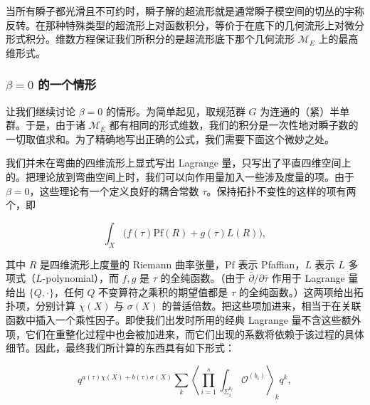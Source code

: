 
当所有瞬子都光滑且不可约时，瞬子解的超流形就是通常瞬子模空间的切丛的宇称反转。在那种特殊类型的超流形上对函数积分，等价于在底下的几何流形上对微分形式积分。维数方程保证我们所积分的是超流形底下那个几何流形 $\mathcal M_E$ 上的最高维形式。

\subsubsection{$\beta=0$ 的一个情形}

让我们继续讨论 $\beta=0$ 的情形。为简单起见，取规范群 $G$ 为连通的（紧）半单群。于是，由于诸 $\mathcal M_E$ 都有相同的形式维数，我们的积分是一次性地对瞬子数的一切取值求和。为了精确地写出正确的公式，我们需要下面这个微妙之处。


我们并未在弯曲的四维流形上显式写出 Lagrange 量，只写出了平直四维空间上的。把理论放到弯曲空间上时，我们可以向作用量加入一些涉及度量的项。由于 $\beta=0$，这些理论有一个定义良好的耦合常数 $\tau$。保持拓扑不变性的这样的项有两个，即

\[
  \int_X\bigl(f(\tau)\mathrm{Pf}(R)+g(\tau)L(R)\bigr),
\]

其中 $R$ 是四维流形上度量的 Riemann 曲率张量，$\mathrm{Pf}$ 表示 Pfaffian，$L$ 表示 $L$ 多项式（$L$-polynomial），而 $f,g$ 是 $\tau$ 的全纯函数。（由于 $\bar\partial/\partial\bar\tau$ 作用于 Lagrange 量给出 $\{Q,\cdot\}$，任何 $Q$ 不变算符之乘积的期望值都是 $\tau$ 的全纯函数。）这两项给出拓扑项，分别计算 $\chi(X)$ 与 $\sigma(X)$ 的普适倍数。把这些项加进来，相当于在关联函数中插入一个乘性因子。即使我们出发时所用的经典 Lagrange 量不含这些额外项，它们在重整化过程中也会被加进来，而它们出现的系数将依赖于该过程的具体细节。因此，最终我们所计算的东西具有如下形式：

\[
  q^{a(\tau)\chi(X)+b(\tau)\sigma(X)}
  \sum_k\left\langle\prod_{i=1}^{s}\int_{\Sigma_i^{b_i}}\mathcal O^{(b_i)}\right\rangle_k q^k,
\]

